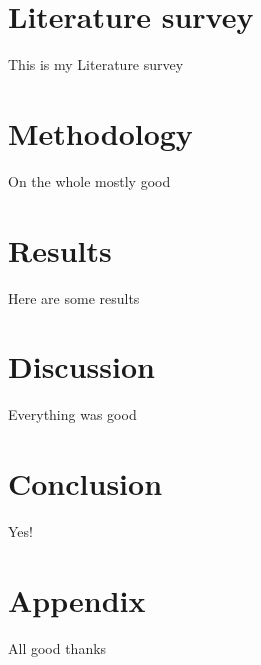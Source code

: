 \documentclass[12pt,a4paper]{article}
\begin{document}
\section{Literature survey}
\citet[p.~2]{latex:guide}
 This is my Literature survey

\section{Methodology}

On the whole mostly good 

\section{Results}

Here are some results 

\section{Discussion}

Everything was good

\section{Conclusion}

Yes!

\section{Appendix}

All good thanks


\end{document}
